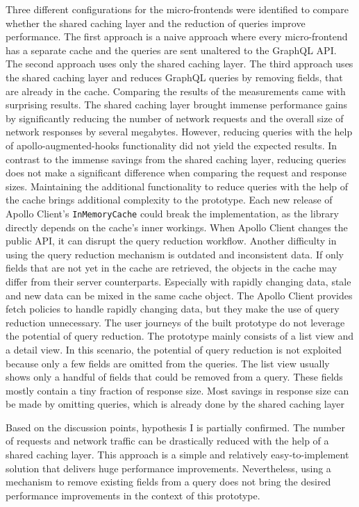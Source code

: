 \noindent Three different configurations for the micro-frontends were identified to compare whether the shared caching layer and the reduction of queries improve performance. The first approach is a naive approach where every micro-frontend has a separate cache and the queries are sent unaltered to the GraphQL \ac{API}. The second approach uses only the shared caching layer. The third approach uses the shared caching layer and reduces GraphQL queries by removing fields, that are already in the cache. Comparing the results of the measurements came with surprising results. The shared caching layer brought immense performance gains by significantly reducing the number of network requests and the overall size of network responses by several megabytes. However, reducing queries with the help of apollo-augmented-hooks functionality did not yield the expected results. In contrast to the immense savings from the shared caching layer, reducing queries does not make a significant difference when comparing the request and response sizes. Maintaining the additional functionality to reduce queries with the help of the cache brings additional complexity to the prototype. Each new release of Apollo Client's \texttt{InMemoryCache} could break the implementation, as the library directly depends on the cache's inner workings. When Apollo Client changes the public \ac{API}, it can disrupt the query reduction workflow. Another difficulty in using the query reduction mechanism is outdated and inconsistent data. If only fields that are not yet in the cache are retrieved, the objects in the cache may differ from their server counterparts. Especially with rapidly changing data, stale and new data can be mixed in the same cache object. The Apollo Client provides fetch policies to handle rapidly changing data, but they make the use of query reduction unnecessary. The user journeys of the built prototype do not leverage the potential of query reduction. The prototype mainly consists of a list view and a detail view. In this scenario, the potential of query reduction is not exploited because only a few fields are omitted from the queries. The list view usually shows only a handful of fields that could be removed from a query. These fields mostly contain a tiny fraction of response size. Most savings in response size can be made by omitting queries, which is already done by the shared caching layer

\bigskip

\noindent Based on the discussion points, hypothesis I is partially confirmed. The number of requests and network traffic can be drastically reduced with the help of a shared caching layer. This approach is a simple and relatively easy-to-implement solution that delivers huge performance improvements. Nevertheless, using a mechanism to remove existing fields from a query does not bring the desired performance improvements in the context of this prototype. 


